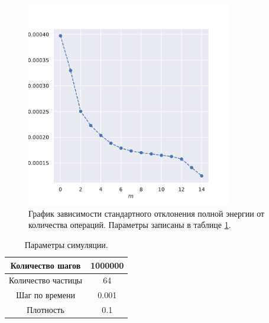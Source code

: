 \documentclass[a4paper,12pt]{report}
\begin{document}
\begin{figure}[H]
    \centering
    \includegraphics[width=0.8\textwidth]{../../media/blocks.pdf}
    \caption{График зависимости стандартного отклонения полной энергии от количества операций. Параметры записаны в таблице \ref{tab4}.}
\end{figure}

\begin{table}[H]
    \centering
    \caption{Параметры симуляции.}
    \label{tab4}
    \begin{tabular}{| c | c |}
        \hline
        Количество шагов & 1000000 \\
        \hline
        Количество частицы & 64 \\
        \hline
        Шаг по времени & 0.001 \\
        \hline
        Плотность & 0.1 \\
        \hline
    \end{tabular}
\end{table}
\end{document}
